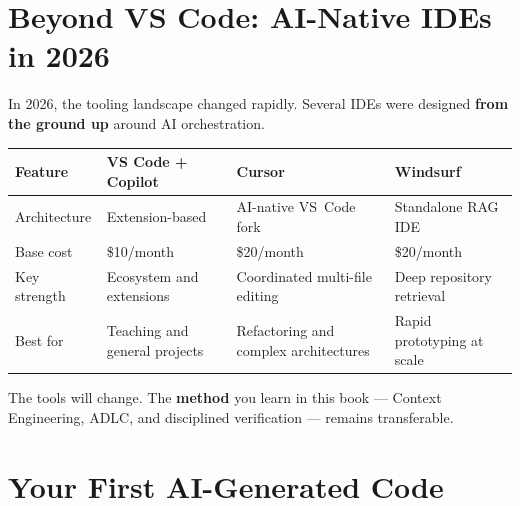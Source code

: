 \section{Beyond VS Code: AI-Native IDEs in 2026}

In 2026, the tooling landscape changed rapidly. Several IDEs were designed \textbf{from the ground up} around AI orchestration.

\begin{center}
\begin{small}
\begin{tabularx}{\textwidth}{l X X X}
\toprule
\textbf{Feature} & \textbf{VS Code + Copilot} & \textbf{Cursor} & \textbf{Windsurf} \\
\midrule
Architecture & Extension-based & AI-native VS~Code fork & Standalone RAG IDE \\
Base cost & \$10/month & \$20/month & \$20/month \\
Key strength & Ecosystem and extensions & Coordinated multi-file editing & Deep repository retrieval \\
Best for & Teaching and general projects & Refactoring and complex architectures & Rapid prototyping at scale \\
\bottomrule
\end{tabularx}
\end{small}
\end{center}

\begin{notebox}
The tools will change. The \textbf{method} you learn in this book --- Context Engineering, ADLC, and disciplined verification --- remains transferable.
\end{notebox}

\section{Your First AI-Generated Code}

